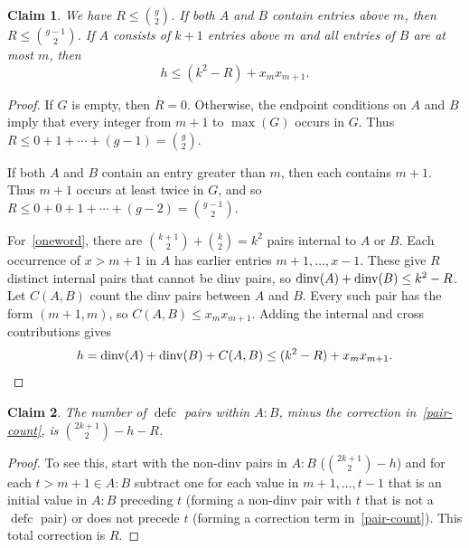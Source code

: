 \documentclass[11pt]{article}
\DeclareMathOperator{\defc}{defc}\DeclareMathOperator{\sym}{sym}
\newtheorem{claim}{Claim}
\begin{document}
\begin{claim}\label{excess-bounds}
We have $R\le\binom g2$. If both $A$ and $B$ contain entries above $m$, then $R\le\binom{g-1}2$. If $A$ consists of $k+1$ entries above $m$ and all entries of $B$ are at most $m$, then
\begin{equation}\label{oneword}
 h\le(k^2-R)+x_mx_{m+1}.
\end{equation}
\end{claim}
\begin{proof}
If $G$ is empty, then $R=0$. Otherwise, the endpoint conditions on $A$ and $B$ imply that every integer from $m+1$ to $\max(G)$ occurs in $G$. Thus $R\le0+1+\cdots+(g-1)=\binom g2$.

If both $A$ and $B$ contain an entry greater than $m$, then each contains $m+1$. Thus $m+1$ occurs at least twice in $G$, and so
 $R\le0+0+1+\cdots+(g-2)=\binom{g-1}2$.

For~\eqref{oneword}, there are $\binom{k+1}2+\binom k2=k^2$ pairs internal to $A$ or $B$. Each occurrence of $x>m+1$ in $A$ has earlier entries $m+1,\ldots,x-1$. These give $R$ distinct internal pairs that cannot be dinv pairs, so $\operatorname{dinv}(A)+\operatorname{dinv}(B)\le k^2-R$. Let $C(A,B)$ count the dinv pairs between $A$ and $B$. Every such pair has the form $(m+1,m)$, so $C(A,B)\le x_mx_{m+1}$. Adding the internal and cross contributions gives
\[
 h=\operatorname{dinv}(A)+\operatorname{dinv}(B)+C(A,B)\le(k^2-R)+x_mx_{m+1}.
\]
\end{proof}

\begin{claim}\label{tail-count}
The number of $\defc$ pairs within $A:B$, minus the correction in~\eqref{pair-count}, is $\binom{2k+1}{2}-h-R$.
\end{claim}
\begin{proof}
To see this, start with the non-dinv pairs in $A:B$ ($\binom{2k+1}{2}-h$) and for each $t>m+1 \in A:B$ subtract one for each value in $m+1,\ldots, t-1$ that is an initial value in $A:B$ preceding $t$ (forming a non-dinv pair with $t$ that is not a $\defc$ pair) or does not precede $t$ (forming a correction term in~\eqref{pair-count}). This total correction is $R$.
\end{proof}
\end{document}
